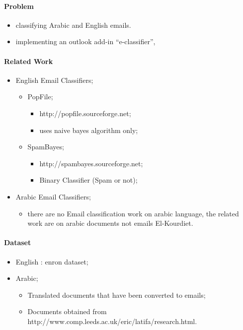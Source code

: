 \documentclass[12pt]{article}
\begin{document}
\paragraph{Problem}
\begin{itemize}
    \item classifying Arabic and English emails.
    \item implementing an outlook add-in “e-classifier”,
\end{itemize}

\paragraph{Related Work}
\begin{itemize}
    \item English Email Classifiers;
    \begin{itemize}
        \item PopFile;
        \begin{itemize}
            \item http://popfile.sourceforge.net;
            \item uses naive bayes algorithm only;
        \end{itemize}
        \item SpamBayes;
        \begin{itemize}
            \item http://spambayes.sourceforge.net;
            \item Binary Classifier (Spam or not);
        \end{itemize}
    \end{itemize}
    \item Arabic Email Classifiers;
    \begin{itemize}
    \item there are no Email classification work on arabic language, the related work are on arabic documents not emails
El-Kourdiet.
    \end{itemize}
\end{itemize}

\paragraph{Dataset}
\begin{itemize}
    \item English : enron dataset;
    \item Arabic;
    \begin{itemize}
        \item Translated documents that have been converted to emails;
        \item Documents obtained from http://www.comp.leeds.ac.uk/eric/latifa/research.html.
    \end{itemize}
\end{itemize}
\end{document}
